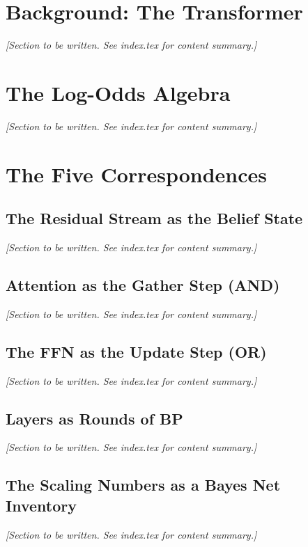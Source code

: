 \documentclass[11pt,letterpaper]{article}
\begin{document}
\section{Background: The Transformer}
\textit{[Section to be written. See index.tex for content summary.]}

\section{The Log-Odds Algebra}
\textit{[Section to be written. See index.tex for content summary.]}

\section{The Five Correspondences}

\subsection{The Residual Stream as the Belief State}
\textit{[Section to be written. See index.tex for content summary.]}

\subsection{Attention as the Gather Step (AND)}
\textit{[Section to be written. See index.tex for content summary.]}

\subsection{The FFN as the Update Step (OR)}
\textit{[Section to be written. See index.tex for content summary.]}

\subsection{Layers as Rounds of BP}
\textit{[Section to be written. See index.tex for content summary.]}

\subsection{The Scaling Numbers as a Bayes Net Inventory}
\textit{[Section to be written. See index.tex for content summary.]}
\end{document}
